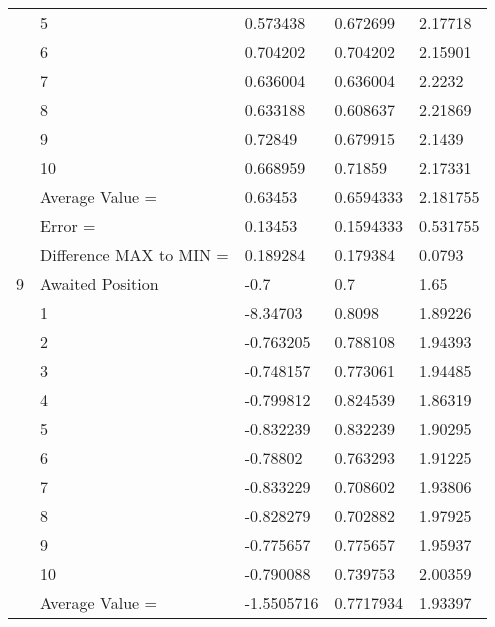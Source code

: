 \begin{tabular}{|p{2cm}|p{3cm}|p{3cm}|p{3cm}|p{3cm}|}
             & 5                       & 0.573438     & 0.672699     & 2.17718    \\
             & 6                       & 0.704202     & 0.704202     & 2.15901    \\
             & 7                       & 0.636004     & 0.636004     & 2.2232     \\
             & 8                       & 0.633188     & 0.608637     & 2.21869    \\
             & 9                       & 0.72849      & 0.679915     & 2.1439     \\
             & 10                      & 0.668959     & 0.71859      & 2.17331    \\
             & Average Value =         & 0.63453      & 0.6594333    & 2.181755   \\
             & Error =                 & 0.13453      & 0.1594333    & 0.531755   \\
             & Difference MAX to MIN = & 0.189284     & 0.179384     & 0.0793     \\
\hline
9            & Awaited Position        & -0.7         & 0.7          & 1.65       \\
             & 1                       & -8.34703     & 0.8098       & 1.89226    \\
             & 2                       & -0.763205    & 0.788108     & 1.94393    \\
             & 3                       & -0.748157    & 0.773061     & 1.94485    \\
             & 4                       & -0.799812    & 0.824539     & 1.86319    \\
             & 5                       & -0.832239    & 0.832239     & 1.90295    \\
             & 6                       & -0.78802     & 0.763293     & 1.91225    \\
             & 7                       & -0.833229    & 0.708602     & 1.93806    \\
             & 8                       & -0.828279    & 0.702882     & 1.97925    \\
             & 9                       & -0.775657    & 0.775657     & 1.95937    \\
             & 10                      & -0.790088    & 0.739753     & 2.00359    \\
             & Average Value =         & -1.5505716   & 0.7717934    & 1.93397    \\

\end{tabular}
